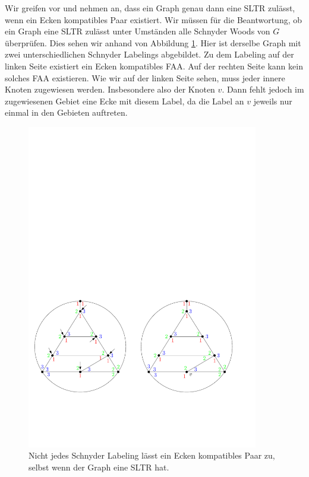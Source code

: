 \begin{example}
Wir greifen vor und nehmen an, dass ein Graph genau dann eine SLTR zulässt, wenn ein Ecken kompatibles Paar existiert. Wir müssen für die Beantwortung, ob ein Graph eine SLTR zulässt unter Umständen alle Schnyder Woods von $G$ überprüfen. Dies sehen wir anhand von Abbildung \ref{exp_ccc}. Hier ist derselbe Graph mit zwei unterschiedlichen Schnyder Labelings abgebildet. Zu dem Labeling auf der linken Seite existiert ein Ecken kompatibles FAA. Auf der rechten Seite kann kein solches FAA existieren. Wie wir auf der linken Seite sehen, muss jeder innere Knoten zugewiesen werden. Insbesondere also der Knoten $v$. Dann fehlt jedoch im zugewiesenen Gebiet eine Ecke mit diesem Label, da die Label an $v$ jeweils nur einmal in den Gebieten auftreten.

\begin{figure}[b]
\centering
\includegraphics[width=0.9\textwidth]{exp_ccc.pdf}
\caption{Nicht jedes Schnyder Labeling lässt ein Ecken kompatibles Paar zu, selbst wenn der Graph eine SLTR hat.}
\label{exp_ccc}
\end{figure}

\end{example}

